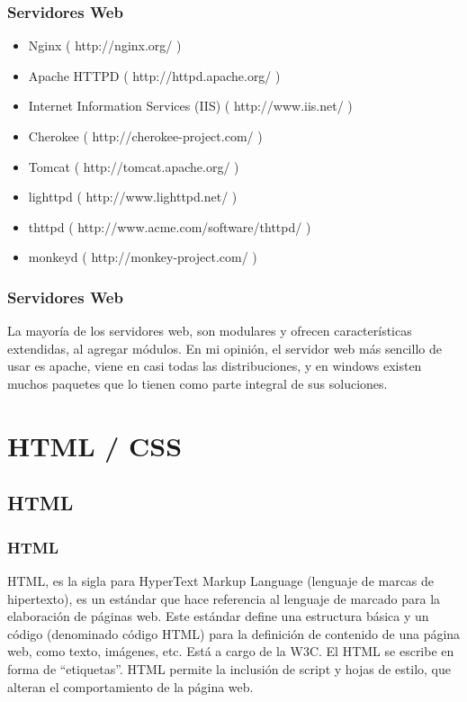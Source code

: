 \documentclass[12pt]{beamer}
\begin{document}
\begin{frame}
 \frametitle{Servidores Web}
 \begin{itemize}
  \item Nginx ( http://nginx.org/ )
  \item Apache HTTPD ( http://httpd.apache.org/ )
  \item Internet Information Services (IIS) ( http://www.iis.net/ )
  \item Cherokee ( http://cherokee-project.com/ )
  \item Tomcat ( http://tomcat.apache.org/ )
  \item lighttpd ( http://www.lighttpd.net/ )
  \item thttpd ( http://www.acme.com/software/thttpd/ )
  \item monkeyd ( http://monkey-project.com/ )
 \end{itemize}
\end{frame}

\begin{frame}
 \frametitle{Servidores Web}
 La mayoría de los servidores web, son modulares y ofrecen características extendidas, al agregar módulos. En mi opinión, el servidor web más sencillo de usar es apache, viene en casi todas las distribuciones, y en windows existen muchos paquetes que lo tienen como parte integral de sus soluciones.
\end{frame}

\section{HTML / CSS}

\subsection{HTML}

\begin{frame}
 \frametitle{HTML}
 HTML, es la sigla para HyperText Markup Language (lenguaje de marcas de hipertexto), es un estándar que hace referencia al lenguaje de marcado para la elaboración de páginas web. Este estándar define una estructura básica y un código (denominado código HTML) para la definición de contenido de una página web, como texto, imágenes, etc. Está a cargo de la W3C.
 \newline
 El HTML se escribe en forma de ``etiquetas''. HTML permite la inclusión de script y hojas de estilo, que alteran el comportamiento de la página web.
\end{frame}
\end{document}
